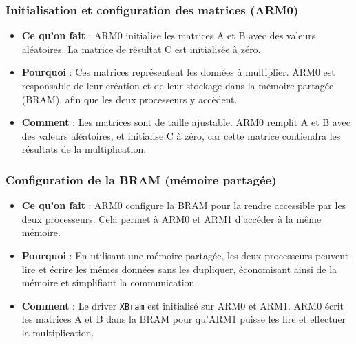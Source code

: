 \documentclass[../CSC_5RO06_TA.tex]{subfiles}
\begin{document}
\subsubsection{Initialisation et configuration des matrices (ARM0)}
\begin{itemize}
\item \textbf{Ce qu’on fait} : ARM0 initialise les matrices A et B avec des valeurs aléatoires. La matrice de résultat C est initialisée à zéro.

\item \textbf{Pourquoi} : Ces matrices représentent les données à multiplier. ARM0 est responsable de leur création et de leur stockage dans la mémoire partagée (BRAM), afin que les deux processeurs y accèdent.

\item \textbf{Comment} : Les matrices sont de taille ajustable. ARM0 remplit A et B avec des valeurs aléatoires, et initialise C à zéro, car cette matrice contiendra les résultats de la multiplication.
\end{itemize}

\subsubsection{Configuration de la BRAM (mémoire partagée)}
\begin{itemize}
\item \textbf{Ce qu’on fait} : ARM0 configure la BRAM pour la rendre accessible par les deux processeurs. Cela permet à ARM0 et ARM1 d’accéder à la même mémoire.

\item \textbf{Pourquoi} : En utilisant une mémoire partagée, les deux processeurs peuvent lire et écrire les mêmes données sans les dupliquer, économisant ainsi de la mémoire et simplifiant la communication.

\item \textbf{Comment} : Le driver \texttt{XBram} est initialisé sur ARM0 et ARM1. ARM0 écrit les matrices A et B dans la BRAM pour qu'ARM1 puisse les lire et effectuer la multiplication.
\end{itemize}
\end{document}
